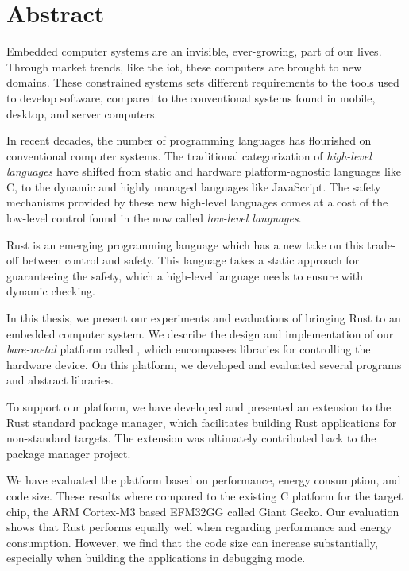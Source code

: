 
\chapter{Abstract}
\label{chap:abstract}

Embedded computer systems are an invisible, ever-growing, part of our lives.
Through market trends, like the \glsdesc{iot}, these computers are brought to new domains.
These constrained systems sets different requirements to the tools used to develop software, compared to the conventional systems found in mobile, desktop, and server computers.

In recent decades, the number of programming languages has flourished on conventional computer systems.
The traditional categorization of \emph{high-level languages} have shifted from static and hardware platform-agnostic languages like C, to the dynamic and highly managed languages like JavaScript.
The safety mechanisms provided by these new high-level languages comes at a cost of the low-level control found in the now called \emph{low-level languages}.

Rust is an emerging programming language which has a new take on this trade-off between control and safety.
This language takes a static approach for guaranteeing the safety, which a high-level language needs to ensure with dynamic checking.

In this thesis, we present our experiments and evaluations of bringing Rust to an embedded computer system.
We describe the design and implementation of our \emph{bare-metal} platform called {\rg}, which encompasses libraries for controlling the hardware device.
On this platform, we developed and evaluated several programs and abstract libraries.

To support our platform, we have developed and presented an extension to the Rust standard package manager, which facilitates building Rust applications for non-standard targets.
The extension was ultimately contributed back to the package manager project.

We have evaluated the platform based on performance, energy consumption, and code size.
These results where compared to the existing C platform for the target chip, the ARM Cortex-M3 based EFM32GG called Giant Gecko.
Our evaluation shows that Rust performs equally well when regarding performance and energy consumption.
However, we find that the code size can increase substantially, especially when building the applications in debugging mode.
